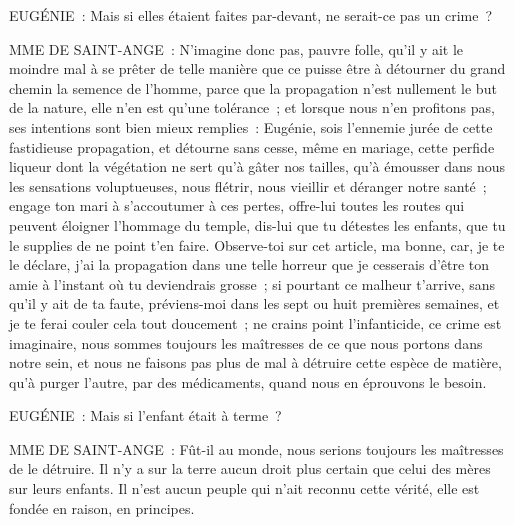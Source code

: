 \documentclass[french,twoside]{book} %
\begin{document}
EUGÉNIE : Mais si elles étaient faites par-devant, ne serait-ce pas un crime ?\par
MME DE SAINT-ANGE : N’imagine donc pas, pauvre folle, qu’il y ait le moindre mal à se prêter de telle manière que ce puisse être à détourner du grand chemin la semence de l’homme, parce que la propagation n’est nullement le but de la nature, elle n’en est qu’une tolérance ; et lorsque nous n’en profitons pas, ses intentions sont bien mieux remplies : Eugénie, sois l’ennemie jurée de cette fastidieuse propagation, et détourne sans cesse, même en mariage, cette perfide liqueur dont la végétation ne sert qu’à gâter nos tailles, qu’à émousser dans nous les sensations voluptueuses, nous flétrir, nous vieillir et déranger notre santé ; engage ton mari à s’accoutumer à ces pertes, offre-lui toutes les routes qui peuvent éloigner l’hommage du temple, dis-lui que tu détestes les enfants, que tu le supplies de ne point t’en faire. Observe-toi sur cet article, ma bonne, car, je te le déclare, j’ai la propagation dans une telle horreur que je cesserais d’être ton amie à l’instant où tu deviendrais grosse ; si pourtant ce malheur t’arrive, sans qu’il y ait de ta faute, préviens-moi dans les sept ou huit premières semaines, et je te ferai couler cela tout doucement ; ne crains point l’infanticide, ce crime est imaginaire, nous sommes toujours les maîtresses de ce que nous portons dans notre sein, et nous ne faisons pas plus de mal à détruire cette espèce de matière, qu’à purger l’autre, par des médicaments, quand nous en éprouvons le besoin.\par
EUGÉNIE : Mais si l’enfant était à terme ?\par
MME DE SAINT-ANGE : Fût-il au monde, nous serions toujours les maîtresses de le détruire. Il n’y a sur la terre aucun droit plus certain que celui des mères sur leurs enfants. Il n’est aucun peuple qui n’ait reconnu cette vérité, elle est fondée en raison, en principes.\par
\end{document}
